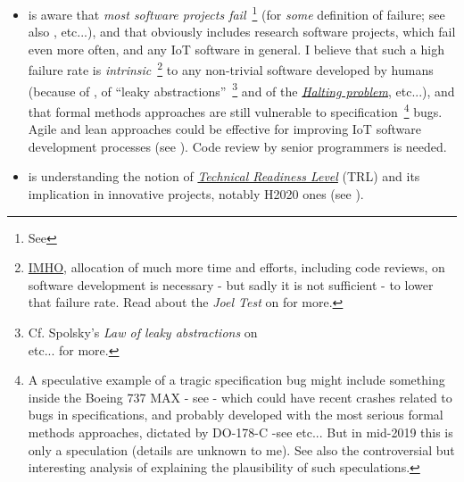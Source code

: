 \begin{itemize}
    \item is aware that \emph{most software projects
    fail}~\footnote{See
    }
      (for \emph{some} definition of failure; see also
      \cite{Brooks:1995:MM, Khan:2016-GSEPIM,
        Attarzadeh:2008:proj-man}, etc...), and that obviously
      includes research software projects, which fail even more often,
      and any IoT software in general. I believe that such a high
      failure rate is
      \emph{intrinsic}~\footnote{\href{https://en.wiktionary.org/wiki/IMHO}{IMHO},
      allocation of much more time and efforts, including code
      reviews, on software development is necessary - but sadly it is
      not sufficient - to lower that failure rate. Read about the
      \emph{Joel Test} on
      for more.}  to any non-trivial software developed by humans
      (because of \cite{Braun:1956:magical-seven}, of ``leaky
      abstractions''~\footnote{Cf. Spolsky's \emph{Law of leaky
      abstractions}  on
      \\ 
      etc... for more.}  and of the
      \href{https://en.wikipedia.org/wiki/Halting\_problem}{\emph{Halting
        problem}}, etc...), and that formal methods approaches are
      still vulnerable   to
      specification~\footnote{A speculative example of a tragic
      specification bug might include something inside the Boeing 737
      MAX - see 
      - which could have recent crashes related to bugs in
      specifications, and probably developed with the most serious
      formal methods approaches, dictated by DO-178-C -see
       etc... But in
      mid-2019 this is only a speculation (details are unknown to
      me). See also the controversial but interesting analysis of
      \cite{graeber:2018:bullshit} explaining the plausibility of such
      speculations.}  bugs. Agile and lean approaches could be
      effective for improving IoT software development processes (see
      \cite{Rodriguez:2019:AgileLean}).  Code
      review by senior programmers is needed.
      

    \item is understanding the notion of
      \href{https://en.wikipedia.org/wiki/Technology\_readiness\_level}{\emph
        {Technical Readiness Level}}  (TRL) and its
      implication in innovative projects, notably H2020  ones (see
      \cite{Heder:2017:TRL}).
      
\end{itemize}


